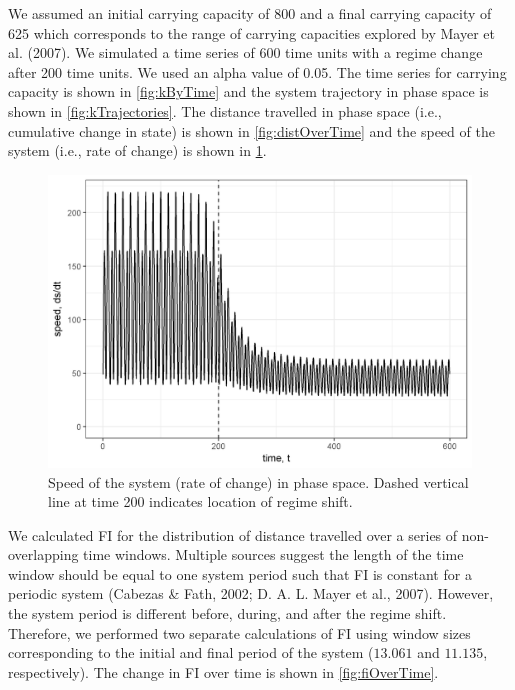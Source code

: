 \documentclass[12pt,twoside,openany]{reedthesis}
\begin{document}
We assumed an initial carrying capacity of 800 and a final carrying
capacity of 625 which corresponds to the range of carrying capacities
explored by Mayer et al. (2007). We simulated a time series of 600 time
units with a regime change after 200 time units. We used an alpha value
of 0.05. The time series for carrying capacity is shown in
\ref{fig:kByTime} and the system trajectory in phase space is shown in
\ref{fig:kTrajectories}. The distance travelled in phase space (i.e.,
cumulative change in state) is shown in \ref{fig:distOverTime} and the
speed of the system (i.e., rate of change) is shown in
\ref{fig:dsdtOverTime}.
\begin{figure}
\includegraphics[width=0.85\linewidth]{./chapterFiles/fiGuide/figures/dsdtOverTime} \caption{Speed of the system (rate of change) in phase space. Dashed vertical line at time 200 indicates location of regime shift.}\label{fig:dsdtOverTime}
\end{figure}
We calculated FI for the distribution of distance travelled over a
series of non-overlapping time windows. Multiple sources suggest the
length of the time window should be equal to one system period such that
FI is constant for a periodic system (Cabezas \& Fath, 2002; D. A. L.
Mayer et al., 2007). However, the system period is different before,
during, and after the regime shift. Therefore, we performed two separate
calculations of FI using window sizes corresponding to the initial and
final period of the system (\(13.061\) and \(11.135\), respectively).
The change in FI over time is shown in \ref{fig:fiOverTime}.
\end{document}
